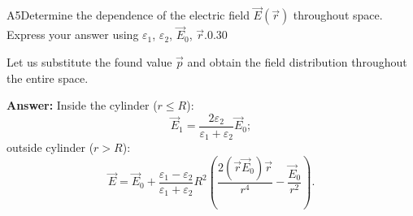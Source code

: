 \documentclass[11pt,a4paper]{article}
\begin{document}
\begin{solcard}{A5}{Determine the dependence of the electric field $\vec{E}(\vec{r})$ throughout space. Express your answer using $\varepsilon_1$, $\varepsilon_2$, $\vec{E}_0$, $\vec{r}$.}{0.30}

Let us substitute the found value $\vec p$ and obtain the field distribution throughout the entire space.

\par\smallskip\noindent\textbf{Answer:} Inside the cylinder ($r \leq R$): $$\vec{E}_1 = \frac{2\varepsilon_2}{\varepsilon_1 + \varepsilon_2} \vec{E}_0;$$outside cylinder ($r > R$): \[\vec{E} = \vec{E}_0 + \frac{\varepsilon_1 - \varepsilon_2}{\varepsilon_1 + \varepsilon_2} R^2\left(\frac{2(\vec{r}\vec{E}_0) \vec{r}}{r^4}-\dfrac{ \vec{E}_0}{r^2}\right).\]
\end{solcard}
\end{document}
